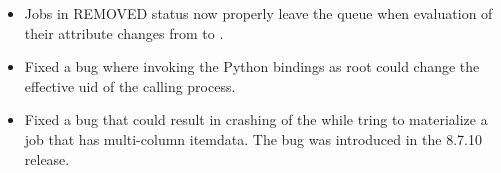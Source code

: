 \begin{itemize}

\item Jobs in REMOVED status now properly leave the queue when
evaluation of their  attribute changes from
 to .

\item Fixed a bug where invoking the Python bindings as root could change
the effective uid of the calling process.

\item Fixed a bug that could result in crashing of the  while
tring to materialize a job that has multi-column itemdata. The bug was introduced in
the 8.7.10 release.

\end{itemize}

